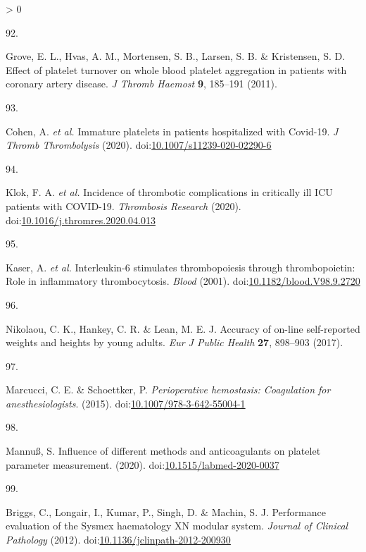 \documentclass[11pt,twoside]{bristolthesis}
\newlength{\cslhangindent}
\newlength{\csllabelwidth}
\newenvironment{CSLReferences}[2] %
 {%
  \setlength{\parindent}{0pt}
  \ifodd #1 \everypar{\setlength{\hangindent}{\cslhangindent}}\ignorespaces\fi
  \ifnum #2 > 0
  \setlength{\parskip}{#2\baselineskip}
  \fi
 }%
 {}
\newcommand{\CSLLeftMargin}[1]{\parbox[t]{\csllabelwidth}{#1}}
\newcommand{\CSLRightInline}[1]{\parbox[t]{\linewidth - \csllabelwidth}{#1}\break}
\begin{document}
\begin{CSLReferences}{0}{0}
\leavevmode\hypertarget{ref-Grove2011a}{}%
\CSLLeftMargin{92. }
\CSLRightInline{Grove, E. L., Hvas, A. M., Mortensen, S. B., Larsen, S. B. \& Kristensen, S. D. {Effect of platelet turnover on whole blood platelet aggregation in patients with coronary artery disease}. \emph{J Thromb Haemost} \textbf{9}, 185--191 (2011).}

\leavevmode\hypertarget{ref-Cohen2020}{}%
\CSLLeftMargin{93. }
\CSLRightInline{Cohen, A. \emph{et al.} {Immature platelets in patients hospitalized with Covid-19}. \emph{J Thromb Thrombolysis} (2020). doi:\href{https://doi.org/10.1007/s11239-020-02290-6}{10.1007/s11239-020-02290-6}}

\leavevmode\hypertarget{ref-Klok2020}{}%
\CSLLeftMargin{94. }
\CSLRightInline{Klok, F. A. \emph{et al.} {Incidence of thrombotic complications in critically ill ICU patients with COVID-19}. \emph{Thrombosis Research} (2020). doi:\href{https://doi.org/10.1016/j.thromres.2020.04.013}{10.1016/j.thromres.2020.04.013}}

\leavevmode\hypertarget{ref-Kaser2001}{}%
\CSLLeftMargin{95. }
\CSLRightInline{Kaser, A. \emph{et al.} {Interleukin-6 stimulates thrombopoiesis through thrombopoietin: Role in inflammatory thrombocytosis}. \emph{Blood} (2001). doi:\href{https://doi.org/10.1182/blood.V98.9.2720}{10.1182/blood.V98.9.2720}}

\leavevmode\hypertarget{ref-Nikolaou2017}{}%
\CSLLeftMargin{96. }
\CSLRightInline{Nikolaou, C. K., Hankey, C. R. \& Lean, M. E. J. {Accuracy of on-line self-reported weights and heights by young adults}. \emph{Eur J Public Health} \textbf{27}, 898--903 (2017).}

\leavevmode\hypertarget{ref-Marcucci2015}{}%
\CSLLeftMargin{97. }
\CSLRightInline{Marcucci, C. E. \& Schoettker, P. \emph{{Perioperative hemostasis: Coagulation for anesthesiologists}}. (2015). doi:\href{https://doi.org/10.1007/978-3-642-55004-1}{10.1007/978-3-642-55004-1}}

\leavevmode\hypertarget{ref-Mannuuxdf2020}{}%
\CSLLeftMargin{98. }
\CSLRightInline{Mannuß, S. {Influence of different methods and anticoagulants on platelet parameter measurement}. (2020). doi:\href{https://doi.org/10.1515/labmed-2020-0037}{10.1515/labmed-2020-0037}}

\leavevmode\hypertarget{ref-Briggs2012}{}%
\CSLLeftMargin{99. }
\CSLRightInline{Briggs, C., Longair, I., Kumar, P., Singh, D. \& Machin, S. J. {Performance evaluation of the Sysmex haematology XN modular system}. \emph{Journal of Clinical Pathology} (2012). doi:\href{https://doi.org/10.1136/jclinpath-2012-200930}{10.1136/jclinpath-2012-200930}}


\end{CSLReferences}
\end{document}
